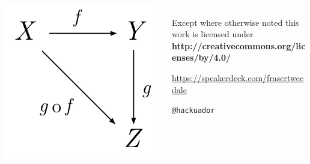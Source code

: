 \documentclass[ignorenonframetext,aspectratio=169]{beamer}
\begin{document}
\begin{frame}[plain]

\begin{columns}

  \begin{column}{.3\textwidth}
    \includegraphics[width=\textwidth]{commutative-diagram.png}
  \end{column}

  \begin{column}{.7\textwidth}

    \setlength{\parskip}{.5em}

    { \centering

    
    \\
    { \scriptsize
    Except where otherwise noted this work is licensed under
    }\\
    { \footnotesize
    \textbf{http://creativecommons.org/licenses/by/4.0/}
    }

    \bigskip

    \large \url{https://speakerdeck.com/frasertweedale}

    \texttt{@hackuador}

    }
  \end{column}

\end{columns}

\end{frame}
\end{document}
